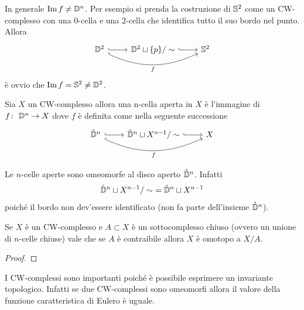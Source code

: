 \begin{remark}
	In generale $\image{f} \neq \D^n$. Per esempio si prenda la costruzione di $\S^2$ come un CW-complesso con una $0$-cella e una $2$-cella che identifica tutto il suo bordo nel punto. Allora 
	\begin{equation*}
	\begin{tikzcd}
		\D^2 \arrow[bend right=25, swap, hook]{rr}{f} \arrow[r,hook] & \D^2 \sqcup \{p\} / \sim \arrow[r,hook] & \S^2
	\end{tikzcd}
	\end{equation*}
	è ovvio che $\image{f} = \S^2 \neq \D^2$. 
\end{remark}

\begin{definition}
	Sia $X$ un CW-complesso allora una n-cella aperta in $X$ è l'immagine di $\morphism{f}{\D^n}{X}$ dove $f$ è definita come nella seguente successione
	\begin{equation}
	\begin{tikzcd}
	\mathring{\D}^n \arrow[bend right=25, swap, hook]{rr}{f} \arrow[r,hook] & \mathring{\D}^n \sqcup X^{n-1} / \sim \arrow[r,hook] & X
	\end{tikzcd}
	\end{equation}
\end{definition}

\begin{remark}
	Le $n$-celle aperte sono omeomorfe al disco aperto $\mathring{\D}^n$. Infatti 
	\begin{equation*}
		\mathring{\D}^n \sqcup X^{n-1} / \sim\ = \mathring{\D}^n \sqcup X^{n-1}
	\end{equation*}
	poiché il bordo non dev'essere identificato (non fa parte dell'insieme $\mathring{\D}^n$).
\end{remark}

\begin{theorem}
	\label{thr:contrai_ncelle_cw_complesso}
	Se $X$ è un CW-complesso e $A \subset X$ è un sottocomplesso chiuso (ovvero un unione di $n$-celle chiuse) vale che se $A$ è contraibile allora $X$ è omotopo a $X / A$.
\end{theorem}
\begin{proof}
\end{proof}

I CW-complessi sono importanti poiché è possibile esprimere un invariante topologico. Infatti se due CW-complessi sono omeomorfi allora il valore della funzione caratteristica di Eulero è uguale. 


